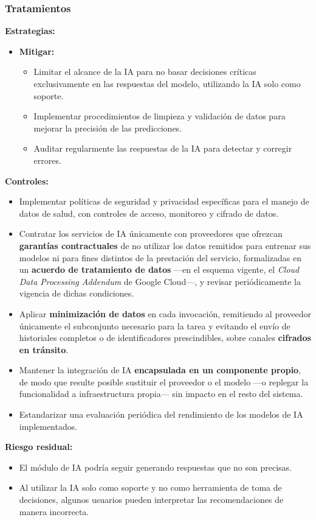 \documentclass[a4paper,12pt]{article}
\begin{document}
    \subsubsection{Tratamientos}
    \par \textbf{Estrategias:}
    \begin{itemize}
        \item \textbf{Mitigar:}
        \begin{itemize}
            \item Limitar el alcance de la IA para no basar decisiones críticas exclusivamente en las respuestas del modelo, utilizando la IA solo como soporte.
            \item Implementar procedimientos de limpieza y validación de datos para mejorar la precisión de las predicciones.
            \item Auditar regularmente las respuestas de la IA para detectar y corregir errores.
        \end{itemize} 
    \end{itemize}
    \par \textbf{Controles:}
    \begin{itemize}
        \item Implementar políticas de seguridad y privacidad específicas para el manejo de datos de salud, con controles de acceso, monitoreo y cifrado de datos.
        \item Contratar los servicios de IA únicamente con proveedores que ofrezcan \textbf{garantías contractuales} de no utilizar los datos remitidos para entrenar sus modelos ni para fines distintos de la prestación del servicio, formalizadas en un \textbf{acuerdo de tratamiento de datos} —en el esquema vigente, el \textit{Cloud Data Processing Addendum} de Google Cloud\cite{GoogleCloudDataGovernance}—, y revisar periódicamente la vigencia de dichas condiciones.
        \item Aplicar \textbf{minimización de datos} en cada invocación, remitiendo al proveedor únicamente el subconjunto necesario para la tarea y evitando el envío de historiales completos o de identificadores prescindibles, sobre canales \textbf{cifrados en tránsito}.
        \item Mantener la integración de IA \textbf{encapsulada en un componente propio}, de modo que resulte posible sustituir el proveedor o el modelo —o replegar la funcionalidad a infraestructura propia— sin impacto en el resto del sistema.
        \item Estandarizar una evaluación periódica del rendimiento de los modelos de IA implementados.
    \end{itemize}
    \par \textbf{Riesgo residual:}
    \begin{itemize}
        \item El módulo de IA podría seguir generando respuestas que no son precisas.
        \item Al utilizar la IA solo como soporte y no como herramienta de toma de decisiones, algunos usuarios pueden interpretar las recomendaciones de manera incorrecta.
    \end{itemize}
\end{document}
